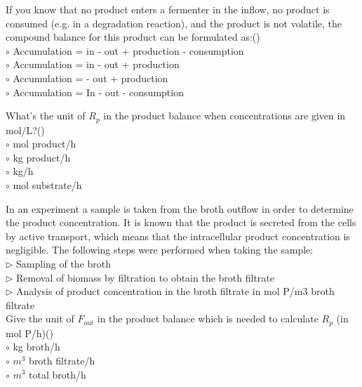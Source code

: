 \documentclass[]{beamer}
\begin{document}
\begin{frame}[shrink] {}
\addtocounter{questions}{1}
\color{blue}
If you know that no product enters a fermenter in the inflow, no product is consumed (e.g. in a degradation reaction), and the product is not volatile, the compound balance for this product can be formulated as:()\\
\color{black}
\setlength{\parindent}{-0.4cm}
{\color{red}$\circ$}  Accumulation = in - out + production - consumption\\
{\color{red}$\circ$} Accumulation = in - out + production \\
{\color{red}$\circ$} Accumulation = - out + production \\
{\color{red}$\circ$} Accumulation = In - out - consumption
\end{frame}

\begin{frame}[shrink] {}
\addtocounter{questions}{1}
\color{blue}
What’s the unit of $R_p$ in the product balance when concentrations are given in mol/L?()\\
\color{black}
\setlength{\parindent}{-0.4cm}
{\color{red}$\circ$} mol product/h \\
{\color{red}$\circ$} kg product/h\\
{\color{red}$\circ$} kg/h\\
{\color{red}$\circ$} mol substrate/h\\
\end{frame}

\begin{frame}[shrink] {}
\addtocounter{questions}{1}
\color{blue}
In an experiment a sample is taken from the broth outflow in order to determine the product concentration. It is known that the product is secreted from the cells by active transport, which means that the intracellular product concentration is negligible. The following steps were performed when taking the sample:\\
{\color{red}$\triangleright$} Sampling of the broth\\
{\color{red}$\triangleright$} Removal of biomass by filtration to obtain the broth filtrate\\
{\color{red}$\triangleright$} Analysis of product concentration in the broth filtrate in mol P/m3 broth filtrate\\[0.5em]

  Give the unit of $F_{out}$ in the product balance which is needed to calculate $R_p$ (in mol P/h)()\\
\color{black}
\setlength{\parindent}{-0.4cm}
{\color{red}$\circ$}  kg broth/h\\
{\color{red}$\circ$} $m^3$ broth filtrate/h \\
{\color{red}$\circ$} $m^3$ total broth/h \\
\end{frame}
\end{document}
